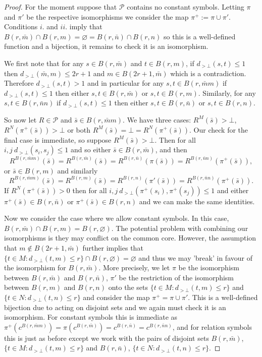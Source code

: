 \documentclass{lmcs} %
\newcommand{\?}{\ensuremath{\mkern0.4\thinmuskip}}
\newcommand{\CP}{\mathcal{P}}
\begin{document}
\begin{proof}
    For the moment suppose that $\CP$ contains no constant symbols. Letting $\pi$ and $\pi'$ be the respective isomorphisms we consider the map $\pi^+:=\pi\cup\pi'$. Conditions $i.$ and $ii.$ imply that $B(r,\bar{m})\cap B(r,m)=\varnothing=B(r,\bar{n})\cap B(r,n)$ so this is a well-defined function and a bijection, it remains to check it is an isomorphism. 
    
    We first note that for any $s\in B(r,\bar{m})$ and $t\in B(r,m)$, if $d_{>\bot}(s,t)\leq 1$ then $d_{>\bot}(\bar{m},m)\leq 2r+1$ and $m\in B(2r+1,\bar{m})$ which is a contradiction. Therefore $d_{>\bot}(s,t)>1$ and in particular for any $s,t\in B(r,\bar{m}m)$ if $d_{>\bot}(s,t)\leq 1$ then either $s,t\in B(r,\bar{m})$ or $s,t\in B(r,m)$. Similarly, for any $s,t\in B(r,\bar{n}n)$ if $d_{>\bot}(s,t)\leq 1$ then either $s,t\in B(r,\bar{n})$ or $s,t\in B(r,n)$.
    
    So now let $R\in\CP$ and $\bar{s}\in B(r,\bar{m}m)$. We have three cases: $R^M(\bar{s})>\bot$, $R^N(\pi^+(\bar{s}))>\bot$ or both $R^M(\bar{s})=\bot=R^N(\pi^+(\bar{s}))$. Our check for the final case is immediate, so suppose $R^M(\bar{s})>\bot$. Then for all $i,j\ d_{>\bot}(s_i,s_j)\leq 1$ and so either $\bar{s}\in B(r,\bar{m})$, and then \[R^{B(r,\bar{m}m)}(\bar{s})=R^{B(r,\bar{m})}(\bar{s})=R^{B(r,\bar{n})}(\pi(\bar{s}))=R^{B(r,\bar{n}n)}(\pi^+(\bar{s})),\] or $\bar{s}\in B(r,m)$ and similarly \[R^{B(r,\bar{m}m)}(\bar{s})=R^{B(r,m)}(\bar{s})=R^{B(r,n)}(\pi'(\bar{s}))=R^{B(r,\bar{n}n)}(\pi^+(\bar{s})).\]
    If $R^N(\pi^+(\bar{s}))>0$ then for all $i,j\ d_{>\bot}(\pi^+(s_i),\pi^+(s_j))\leq 1$ and either $\pi^+(\bar{s})\in B(r,\bar{n})$ or $\pi^+(\bar{s})\in B(r,n)$ and we can make the same identities. 

    Now we consider the case where we allow constant symbols. In this case, $B(r,\bar{m})\cap B(r,m)=B(r,\varnothing)$. The potential problem with combining our isomorphisms is they may conflict on the common core. However, the assumption that $m\not\in B(2r+1,\bar{m})$ further implies that $\{t\in M:d_{>\bot}(t,m)\leq r\}\cap B(r,\varnothing)=\varnothing$ and thus we may 'break' in favour of the isomorphism for $B(r,\bar{m})$. More precisely, we let $\pi$ be the isomorphism between $B(r,\bar{m})$ and $B(r,\bar{n})$, $\pi'$ be the restriction of the isomorphism between $B(r,m)$ and $B(r,n)$ onto the sets $\{t\in M:d_{>\bot}(t,m)\leq r\}$ and $\{t\in N:d_{>\bot}(t,n)\leq r\}$ and consider the map $\pi^+=\pi\cup\pi'$. This is a well-defined bijection due to acting on disjoint sets and we again must check it is an isomorphism. For constant symbols this is immediate as $\pi^+(c^{B(r,\bar{m}m)})=\pi(c^{B(r,\bar{m})})=c^{B(r,\bar{n})}=c^{B(r,\bar{n}n)}$, and for relation symbols this is just as before except we work with the pairs of disjoint sets $B(r,\bar{m})$, $\{t\in M:d_{>\bot}(t,m)\leq r\}$ and $B(r,\bar{n})$, $\{t\in N:d_{>\bot}(t,n)\leq r\}$. 
\end{proof}
\end{document}
